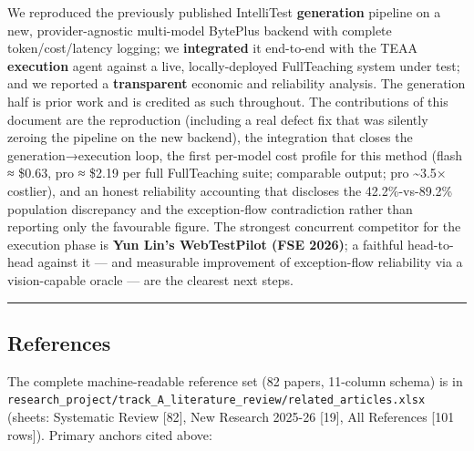 \documentclass[
]{article}
\begin{document}
We reproduced the previously published IntelliTest \textbf{generation}
pipeline on a new, provider-agnostic multi-model BytePlus backend with
complete token/cost/latency logging; we \textbf{integrated} it
end-to-end with the TEAA \textbf{execution} agent against a live,
locally-deployed FullTeaching system under test; and we reported a
\textbf{transparent} economic and reliability analysis. The generation
half is prior work and is credited as such throughout. The contributions
of this document are the reproduction (including a real defect fix that
was silently zeroing the pipeline on the new backend), the integration
that closes the generation→execution loop, the first per-model cost
profile for this method (flash ≈ \$0.63, pro ≈ \$2.19 per full
FullTeaching suite; comparable output; pro \textasciitilde3.5×
costlier), and an honest reliability accounting that discloses the
42.2\%-vs-89.2\% population discrepancy and the exception-flow
contradiction rather than reporting only the favourable figure. The
strongest concurrent competitor for the execution phase is \textbf{Yun
Lin's WebTestPilot (FSE 2026)}; a faithful head-to-head against it ---
and measurable improvement of exception-flow reliability via a
vision-capable oracle --- are the clearest next steps.

\begin{center}\rule{0.5\linewidth}{0.5pt}\end{center}

\subsection{References}\label{references}

The complete machine-readable reference set (82 papers, 11-column
schema) is in
\texttt{research\_project/track\_A\_literature\_review/related\_articles.xlsx}
(sheets: Systematic Review {[}82{]}, New Research 2025-26 {[}19{]}, All
References {[}101 rows{]}). Primary anchors cited above:
\end{document}
